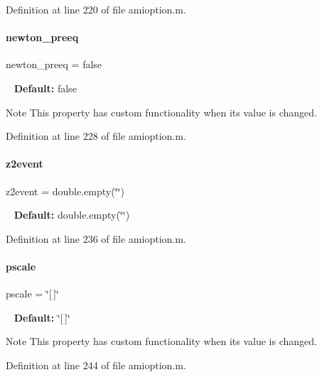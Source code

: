 Definition at line 220 of file amioption.\+m.

\mbox{\label{classamioption_a6f07b6b706ac3305e478f576747ad088}} 
\paragraph{\texorpdfstring{newton\_preeq}{newton\_preeq}}
{\footnotesize\ttfamily newton\+\_\+preeq = false}

~\newline
{\bfseries{Default\+:}} false

\begin{DoxyNote}{Note}
This property has custom functionality when its value is changed. 
\end{DoxyNote}


Definition at line 228 of file amioption.\+m.

\mbox{\label{classamioption_a7a7be015feeb7a346dceccd49e622b4b}} 
\paragraph{\texorpdfstring{z2event}{z2event}}
{\footnotesize\ttfamily z2event = double.\+empty(\char`\"{}\char`\"{})}

~\newline
{\bfseries{Default\+:}} double.\+empty(\char`\"{}\char`\"{}) 

Definition at line 236 of file amioption.\+m.

\mbox{\label{classamioption_a4dc67beb394b49ebeccf6a99dd932ee3}} 
\paragraph{\texorpdfstring{pscale}{pscale}}
{\footnotesize\ttfamily pscale = \char`\"{}\mbox{[}$\,$\mbox{]}\char`\"{}}

~\newline
{\bfseries{Default\+:}} \char`\"{}\mbox{[}$\,$\mbox{]}\char`\"{}

\begin{DoxyNote}{Note}
This property has custom functionality when its value is changed. 
\end{DoxyNote}


Definition at line 244 of file amioption.\+m.

